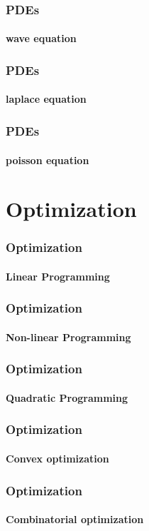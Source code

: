 \begin{frame}
\frametitle{PDEs}
\framesubtitle{wave equation}
\logoCSIPCPL\mypagenum
\end{frame}


\begin{frame}
\frametitle{PDEs}
\framesubtitle{laplace equation}
\logoCSIPCPL\mypagenum
\end{frame}



\begin{frame}
\frametitle{PDEs}
\framesubtitle{poisson equation}
\logoCSIPCPL\mypagenum
\end{frame}



\section{Optimization}
\begin{frame}
\frametitle{Optimization}
\framesubtitle{Linear Programming}
\logoCSIPCPL\mypagenum

\end{frame}

\begin{frame}
\frametitle{Optimization}
\framesubtitle{Non-linear Programming}
\logoCSIPCPL\mypagenum
\end{frame}


\begin{frame}
\frametitle{Optimization}
\framesubtitle{Quadratic Programming}
\logoCSIPCPL\mypagenum
\end{frame}



\begin{frame}
\frametitle{Optimization}
\framesubtitle{Convex optimization}
\logoCSIPCPL\mypagenum
\end{frame}


\begin{frame}
\frametitle{Optimization}
\framesubtitle{Combinatorial optimization}
\logoCSIPCPL\mypagenum
\end{frame}



